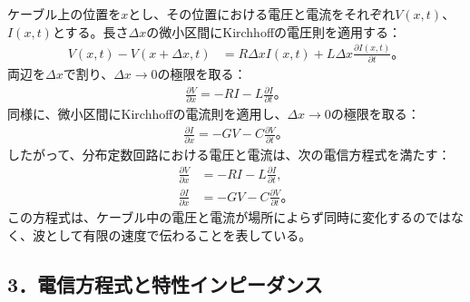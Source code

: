 \documentclass[platex,dvipdfmx,a4paper]{jsarticle}
\newcommand{\hb}[2]{\frac{\partial #1}{\partial #2}}
\begin{document}
ケーブル上の位置を$x$とし、その位置における電圧と電流をそれぞれ$V(x,t)$、$I(x,t)$とする。長さ$\Delta x$の微小区間にKirchhoffの電圧則を適用する：
\begin{align*}
  V(x,t)-V(x+\Delta x,t)
  &=R\Delta x I(x,t)+L\Delta x\hb{I(x,t)}{t}。
\end{align*}
両辺を$\Delta x$で割り、$\Delta x\to0$の極限を取る：
\begin{align*}
  \hb{V}{x}=-RI-L\hb{I}{t}。
\end{align*}
同様に、微小区間にKirchhoffの電流則を適用し、$\Delta x\to0$の極限を取る：
\begin{align*}
  \hb{I}{x}=-GV-C\hb{V}{t}。
\end{align*}
したがって、分布定数回路における電圧と電流は、次の電信方程式を満たす：
\begin{align*}
  \hb{V}{x}
  &=-RI-L\hb{I}{t}, \\
  \hb{I}{x}
  &=-GV-C\hb{V}{t}。
\end{align*}
この方程式は、ケーブル中の電圧と電流が場所によらず同時に変化するのではなく、波として有限の速度で伝わることを表している。

\subsection*{3．電信方程式と特性インピーダンス}
\end{document}
